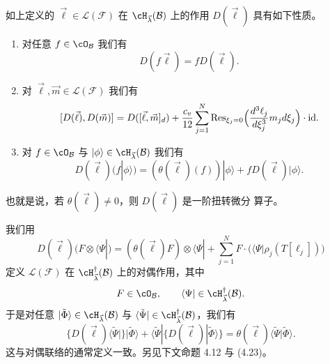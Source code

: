 \begin{proposition}[4.6]
如上定义的 $\vec{\ell}\in\mathcal{L}(\mathcal{F})$ 在
$\cH_{\vec{\lambda}}(\mathcal{B})$ 上的作用 $D(\vec{\ell})$ 具有如下性质。
\begin{enumerate}
\item[(1)] 对任意 $f\in\cO_\mathcal{B}$ 我们有
\[
  D(f\vec{\ell})=fD(\vec{\ell}) .
\]
\item[(2)] 对 $\vec{\ell},\vec{m}\in\mathcal{L}(\mathcal{F})$ 我们有
\[
  [D(\vec{\ell}),D(\vec{m})] = D([\vec{\ell},\vec{m}]_d)
  +\frac{c_v}{12}\sum_{j=1}^N\operatorname{Res}_{\xi_j=0}
  \Bigl(\frac{d^3\ell_j}{d\xi_j^3}m_jd\xi_j\Bigr)\cdot\mathrm{id} .
\]
\item[(3)] 对 $f\in\cO_\mathcal{B}$ 与
$|\phi\rangle\in\cH_{\vec{\lambda}}(\mathcal{B})$ 我们有
\[
  D(\vec{\ell})(f|\phi\rangle)
  =(\theta(\vec{\ell})(f))|\phi\rangle+fD(\vec{\ell})|\phi\rangle .
\]
\end{enumerate}
也就是说，若 $\theta(\vec{\ell})\ne 0$，则 $D(\vec{\ell})$ 是一阶扭转微分
算子。
\end{proposition}

我们用
\begin{equation}
  D(\vec{\ell})(F\otimes\langle\Psi|)
  = (\theta(\vec{\ell})F)\otimes\langle\Psi|
  +\sum_{j=1}^NF\cdot\bigl(\langle\Psi|\rho_j(T[\ell_j])\bigr)
  \tag{4.18}
\end{equation}
定义 $\mathcal{L}(\mathcal{F})$ 在 $\cH_{\vec{\lambda}}^\dagger(\mathcal{B})$
上的对偶作用，其中
\[
  F\in\cO_\mathcal{B},\qquad
  \langle\Psi|\in\cH_{\vec{\lambda}}^\dagger(\mathcal{B}) .
\]
于是对任意 $|\tilde{\Phi}\rangle\in\cH_{\vec{\lambda}}(\mathcal{B})$ 与
$\langle\tilde{\Psi}|\in\cH_{\vec{\lambda}}^\dagger(\mathcal{B})$，我们有
\begin{equation}
  \{D(\vec{\ell})\langle\tilde{\Psi}|\}|\tilde{\Phi}\rangle
  +\langle\tilde{\Psi}|\{D(\vec{\ell})|\tilde{\Phi}\rangle\}
  = \theta(\vec{\ell})\langle\tilde{\Psi}|\tilde{\Phi}\rangle . \tag{4.19}
\end{equation}
这与对偶联络的通常定义一致。另见下文命题 4.12 与 (4.23)。

